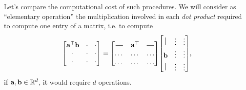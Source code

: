 Let's compare the computational cost of such procedures. We will consider as ``elementary operation'' the multiplication involved in each \emph{dot product} required to compute one entry of a matrix, i.e. to compute
\begin{equation}
    \mqty[
        \vb{a}^{\top} \vb{b} & \cdot & \cdot \\
        \cdot & \cdot & \cdot \\
        \cdot & \cdot & \cdot
    ] = \mqty[\horzbar & \vb{a}^{\top} & \horzbar \\
    \dots & \dots & \dots \\
    \dots & \dots & \dots] 
    \mqty[\vertbar & \vdots & \vdots \\
    \vb{b} & \vdots & \vdots \\
    \vertbar & \vdots & \vdots],
\end{equation}
if $\vb{a}, \vb{b} \in \mathbb{R}^d$, it would require $d$ operations.

